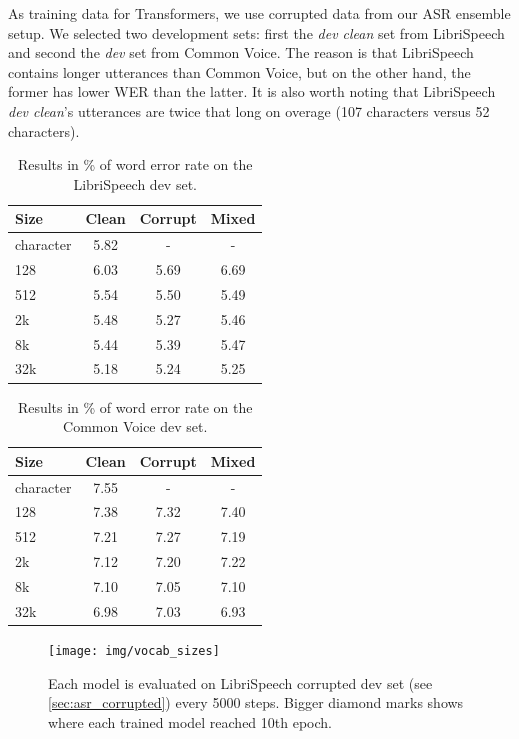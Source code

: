 As training data for Transformers, we use corrupted data from our ASR ensemble setup. We selected two development sets: first the \textit{dev clean} set from LibriSpeech and second the \textit{dev} set from Common Voice. The reason is that LibriSpeech contains longer utterances than Common Voice, but on the other hand, the former has lower WER than the latter. It is also worth noting that LibriSpeech \textit{dev clean}'s utterances are twice that long on overage (107 characters versus 52 characters).


\begin{table}[p]
	\centering
	\begin{tabular}{l|ccc}
		\bf Size & \bf Clean & \bf Corrupt & \bf Mixed \\
		\hline
		character &  5.82  &  -  &  -  \\
		128 &  6.03  &  5.69  &  6.69  \\
		512 &    5.54  &  5.50   &  5.49 \\
		2k &  5.48  & 5.27  & 5.46  \\
		8k &  5.44  &   5.39 & 5.47  \\
		32k &  5.18  & 5.24  &  5.25 \\
		
	\end{tabular}
	\caption{Results in \% of word error rate on the LibriSpeech dev set.}
	\label{tab:results_vocabularies_libri}
\end{table}

\begin{table}[p]
	\centering
	\begin{tabular}{l|ccc}
		\bf Size & \bf Clean & \bf Corrupt & \bf Mixed \\
		\hline
		character &  7.55  &  -  &  -  \\
		128 & 7.38   &  7.32  & 7.40  \\
		512 &  7.21  & 7.27   & 7.19  \\
		2k & 7.12   & 7.20 & 7.22  \\
		8k &  7.10  & 7.05  & 7.10  \\
		32k &  6.98  & 7.03  &  6.93 \\
		
	\end{tabular}
	\caption{Results in \% of word error rate on the Common Voice dev set.}
	\label{tab:results_vocabularies_common}
\end{table}

\begin{figure}[p]
	\texttt{[image: img/vocab\_sizes]}
	\caption{Each model is evaluated on LibriSpeech corrupted dev set (see \cref{sec:asr_corrupted}) every 5000 steps. Bigger diamond marks shows where each trained model reached 10th epoch.}
	\label{fig:vocab_sizes}
\end{figure}

